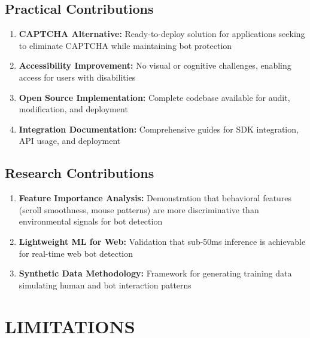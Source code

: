 \subsection{Practical Contributions}

\begin{enumerate}
    \item \textbf{CAPTCHA Alternative:} Ready-to-deploy solution for applications seeking to eliminate CAPTCHA while maintaining bot protection
    
    \item \textbf{Accessibility Improvement:} No visual or cognitive challenges, enabling access for users with disabilities
    
    \item \textbf{Open Source Implementation:} Complete codebase available for audit, modification, and deployment
    
    \item \textbf{Integration Documentation:} Comprehensive guides for SDK integration, API usage, and deployment
\end{enumerate}

\subsection{Research Contributions}

\begin{enumerate}
    \item \textbf{Feature Importance Analysis:} Demonstration that behavioral features (scroll smoothness, mouse patterns) are more discriminative than environmental signals for bot detection
    
    \item \textbf{Lightweight ML for Web:} Validation that sub-50ms inference is achievable for real-time web bot detection
    
    \item \textbf{Synthetic Data Methodology:} Framework for generating training data simulating human and bot interaction patterns
\end{enumerate}

\section{LIMITATIONS}

